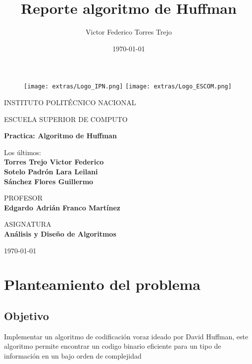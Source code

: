 \documentclass[12 pt]{report}
\title{Reporte algoritmo de Huffman}
\author{Victor Federico Torres Trejo}
\date{\today}
\begin{document}
\thispagestyle{empty}

\begin{figure}[ht]
  \texttt{[image: extras/Logo\_IPN.png]}
  \label{EscudoIPN}
  \endminipage
  \texttt{[image: extras/Logo\_ESCOM.png]}
  \label{EscudoESCOM}
  \endminipage
\end{figure}

\begin{center}
  \vspace{0.8cm}
  \LARGE
  INSTITUTO POLITÉCNICO NACIONAL
  
  \vspace{0.8cm}
  \LARGE
  ESCUELA SUPERIOR DE COMPUTO
  
  \vspace{1.5cm}	
  \Large
  \textbf{Practica: Algoritmo de Huffman}

  \vspace{1.0cm}
  \normalsize	
  Los últimos:  \\
  \vspace{.3cm}
  \large
  \textbf{Torres Trejo Victor Federico \\ Sotelo Padrón Lara Leilani \\ Sánchez Flores Guillermo}
  
  \vspace{1cm}
  \normalsize	
  PROFESOR \\
  \vspace{.3cm}
  \large
  \textbf{Edgardo Adrián Franco Martínez}

  \vspace{1cm}
  \normalsize	
  ASIGNATURA \\
  \vspace{.3cm}
  \large
  \textbf{Análisis y Diseño de Algoritmos\\}
  
  \vspace{1cm}
  \today
\end{center}

\tableofcontents

\chapter{Planteamiento del problema}
\section{Objetivo}
Implementar un algoritmo de codificación voraz ideado por David Huffman, este algoritmo permite encontrar un codigo binario eficiente para un tipo de información en un bajo orden de complejidad
\end{document}
